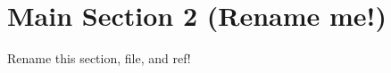 \section{Main Section 2 (Rename me!)}
\label{sec:main-sec-2}

Rename this section, file, and ref!


